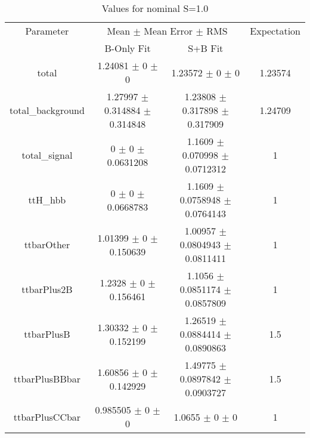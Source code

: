 \begin{table}
\centering
\caption{Values for nominal S=1.0}
\begin{tabular}{cccc}
\toprule
Parameter & \multicolumn{2}{c}{Mean $\pm$ Mean Error $\pm$ RMS} & Expectation\\
 & B-Only Fit & S+B Fit & \\
\midrule
total & \num{1.24081} $\pm$ \num{0} $\pm$ \num{0} & \num{1.23572} $\pm$ \num{0} $\pm$ \num{0} & \num{1.23574}\\
total\_background & \num{1.27997} $\pm$ \num{0.314884} $\pm$ \num{0.314848} & \num{1.23808} $\pm$ \num{0.317898} $\pm$ \num{0.317909} & \num{1.24709}\\
total\_signal & \num{0} $\pm$ \num{0} $\pm$ \num{0.0631208} & \num{1.1609} $\pm$ \num{0.070998} $\pm$ \num{0.0712312} & \num{1}\\
ttH\_hbb & \num{0} $\pm$ \num{0} $\pm$ \num{0.0668783} & \num{1.1609} $\pm$ \num{0.0758948} $\pm$ \num{0.0764143} & \num{1}\\
ttbarOther & \num{1.01399} $\pm$ \num{0} $\pm$ \num{0.150639} & \num{1.00957} $\pm$ \num{0.0804943} $\pm$ \num{0.0811411} & \num{1}\\
ttbarPlus2B & \num{1.2328} $\pm$ \num{0} $\pm$ \num{0.156461} & \num{1.1056} $\pm$ \num{0.0851174} $\pm$ \num{0.0857809} & \num{1}\\
ttbarPlusB & \num{1.30332} $\pm$ \num{0} $\pm$ \num{0.152199} & \num{1.26519} $\pm$ \num{0.0884414} $\pm$ \num{0.0890863} & \num{1.5}\\
ttbarPlusBBbar & \num{1.60856} $\pm$ \num{0} $\pm$ \num{0.142929} & \num{1.49775} $\pm$ \num{0.0897842} $\pm$ \num{0.0903727} & \num{1.5}\\
ttbarPlusCCbar & \num{0.985505} $\pm$ \num{0} $\pm$ \num{0} & \num{1.0655} $\pm$ \num{0} $\pm$ \num{0} & \num{1}\\
\bottomrule
\end{tabular}
\end{table}